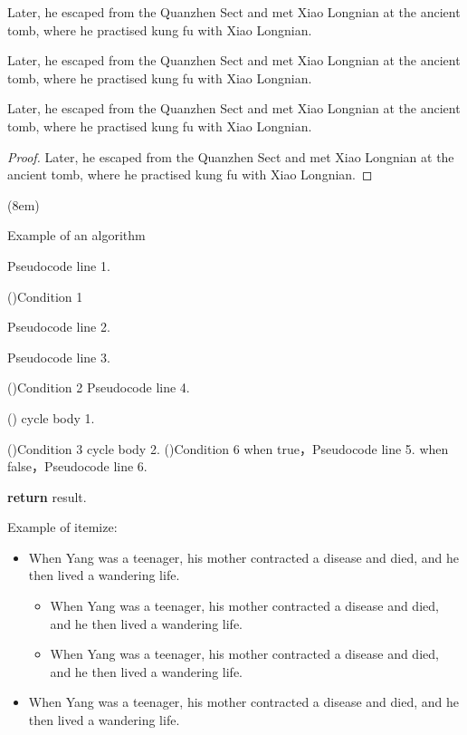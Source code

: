 \documentclass[print, doctor, vlined]{DissertUESTC}
\begin{document}
	\begin{Lemma}[Name]
		Later, he escaped from the Quanzhen Sect and met Xiao Longnian at the ancient tomb, where he practised kung fu with Xiao Longnian.
	\end{Lemma}

	\begin{Example}[Name]
		Later, he escaped from the Quanzhen Sect and met Xiao Longnian at the ancient tomb, where he practised kung fu with Xiao Longnian.
	\end{Example}

	\begin{Assumption}[Name]
		Later, he escaped from the Quanzhen Sect and met Xiao Longnian at the ancient tomb, where he practised kung fu with Xiao Longnian.
	\end{Assumption}
	
	\begin{proof}
		Later, he escaped from the Quanzhen Sect and met Xiao Longnian at the ancient tomb, where he practised kung fu with Xiao Longnian.
	\end{proof}
	

	\begin{algo}[!h](8em)
		\caption{Example of an algorithm}

		Pseudocode line 1.
		
		\For(){Condition 1}{
			Pseudocode line 2.
			
			Pseudocode line 3.
			
			\DoWhile(){Condition 2}{
				Pseudocode line 4.
			}
			
			\Loop(){
				cycle body 1.
			}
			
			\Repeat(){Condition 3}{
				cycle body 2.
			}
			\eIf(){Condition 6}{
				when true，Pseudocode line 5.
			}{
				when false，Pseudocode line 6.
			}
		}
		\textbf{return} result.
	\end{algo}
	

	Example of itemize:

	\begin{itemize}
		\item When Yang was a teenager, his mother contracted a disease and died, and he then lived a wandering life.
		\begin{itemize}
			\item When Yang was a teenager, his mother contracted a disease and died, and he then lived a wandering life.
			\item When Yang was a teenager, his mother contracted a disease and died, and he then lived a wandering life.
		\end{itemize}
		\item When Yang was a teenager, his mother contracted a disease and died, and he then lived a wandering life.
	\end{itemize}
\end{document}
